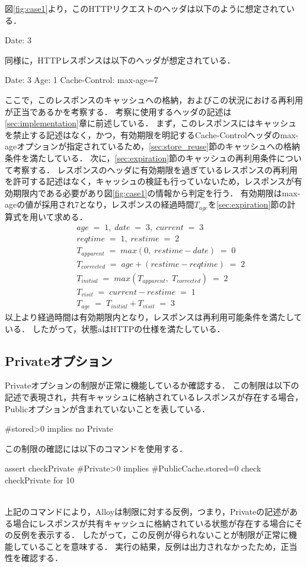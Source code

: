 \documentclass{css}
\begin{document}
図\ref{fig:case1}より，このHTTPリクエストのヘッダは以下のように想定されている．
\begin{verbatimtab}[4]
	Date: 3
\end{verbatimtab}
同様に，HTTPレスポンスは以下のヘッダが想定されている．
\begin{verbatimtab}[4]
	Date: 3
	Age: 1
	Cache-Control: max-age=7
\end{verbatimtab}
ここで，このレスポンスのキャッシュへの格納，およびこの状況における再利用が正当であるかを考察する．
考察に使用するヘッダの記述は\ref{sec:implementation}章に前述している．
まず，このレスポンスにはキャッシュを禁止する記述はなく，かつ，有効期限を明記するCache-Controlヘッダのmax-ageオプションが指定されているため，\ref{sec:store_reuse}節のキャッシュへの格納条件を満たしている．
次に，\ref{sec:expiration}節のキャッシュの再利用条件について考察する．
レスポンスのヘッダに有効期限を過ぎているレスポンスの再利用を許可する記述はなく，キャッシュの検証も行っていないため，レスポンスが有効期限内である必要があり図\ref{fig:case1}の情報から判定を行う．
有効期限はmax-ageの値が採用され7となり，レスポンスの経過時間$T_{age}$を\ref{sec:expiration}節の計算式を用いて求める．
\begin{eqnarray*}
&&age\;=\;1,\; date\;=\;3,\; current\;=\;3\\
&&reqtime\;=\;1,\; restime\;=\;2\\
&&T_{apparent}\;=\;max(0,\;restime - date)\;=\;0\\
&&T_{corrected}\;=\;age + (restime - reqtime)\;=\;2\\
&&T_{initial}\;=\;max(T_{apparent},\;T_{corrected})\;=\;2\\
&&T_{visit}\;=\;current - restime\;=\;1\\
&&T_{age}\;=\;T_{initial} + T_{visit}\;=\;3
\end{eqnarray*}
以上より経過時間は有効期限内となり，レスポンスは再利用可能条件を満たしている．
したがって，状態aはHTTPの仕様を満たしている．

\subsection{Privateオプション}
Privateオプションの制限が正常に機能しているか確認する．
この制限は以下の記述で表現され，共有キャッシュに格納されているレスポンスが存在する場合，Publicオプションが含まれていないことを表している．
\begin{verbatimtab}[2]
	#stored>0 implies no Private
\end{verbatimtab}
この制限の確認には以下のコマンドを使用する．\\\hrulefill
\begin{small}
\begin{verbatimtab}[2]
assert checkPrivate{
	#Private>0 implies #PublicCache.stored=0
}
check checkPrivate for 10
\end{verbatimtab}
\end{small}
\hrulefill\\
上記のコマンドにより，Alloyは制限に対する反例，つまり，Privateの記述がある場合にレスポンスが共有キャッシュに格納されている状態が存在する場合にその反例を表示する．
したがって，この反例が得られないことが制限が正常に機能していることを意味する．
実行の結果，反例は出力されなかったため，正当性を確認する．
\end{document}
